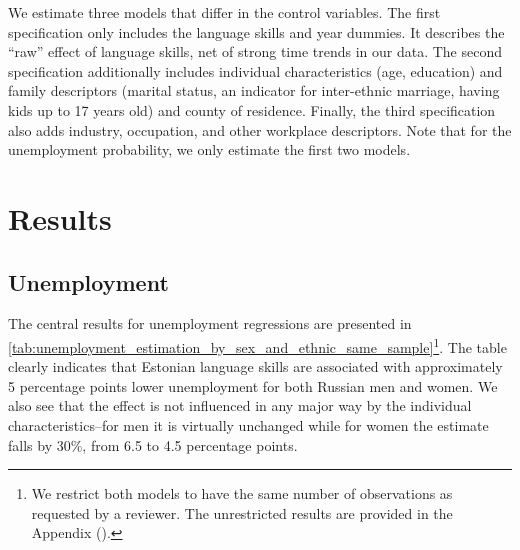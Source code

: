 \documentclass[12pt, a4paper]{article}
\begin{document}
We estimate three models that differ in the control variables. The first specification only includes the language skills
and year dummies. It describes the ``raw'' effect of language skills,
net of strong time trends in our data.
The second specification additionally includes individual
characteristics (age, education) and family descriptors (marital
status, an indicator for inter-ethnic marriage, having kids up to 17 years
old) and county of residence. 
Finally, the third specification also adds industry, occupation, and other
workplace descriptors.
Note that for the unemployment probability,
we only estimate the first two models.


\section{Results}
\label{sec:results}
\subsection{Unemployment}
\label{subsec:basic_model_unemployment}

The central results for unemployment regressions are presented in
\cref{tab:unemployment_estimation_by_sex_and_ethnic_same_sample}\footnote{We
 restrict both models to have the same number of observations as
 requested by a reviewer. The unrestricted results are provided in the Appendix ().}.
The
table clearly indicates that Estonian language skills are associated
with approximately 5 percentage points lower unemployment for both
Russian men and women. We also see that the effect is not 
influenced in any major way by the individual characteristics--for men it is
virtually unchanged while for women the estimate falls by 30\%, from
6.5 to 4.5 percentage points.
\end{document}
